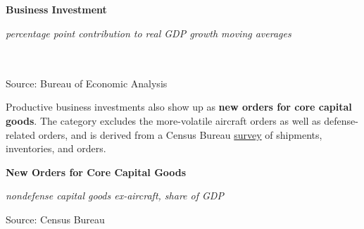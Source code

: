 \documentclass{report}
\newcommand{\tbllink}[1]{\href{https://raw.githubusercontent.com/bdecon/US-chartbook/master/chartbook/data/#1}{\faTable}}
\begin{document}
{{{\begin{minipage}{0.76\textwidth}
\vspace{3mm}

\small

 

\end{minipage}

\noindent \normalsize \textbf{Business Investment}\\
\footnotesize{\textit{percentage point contribution to real GDP growth \hspace{36mm} moving averages}\\ \vspace{4mm}
\noindent {} \setlength{\tabcolsep}{3.1pt} \color{black!90}
		{\renewcommand{\arraystretch}{1.55}
		 \begin{tabular}{p{42mm} R{6.7mm} R{6.7mm} R{6.7mm} R{6.7mm} R{6.7mm} 
		   R{7.8mm} R{6.7mm} R{6.7mm} }
			 \hline
		\end{tabular}
		}	\\
		
\vspace{-6mm}
\footnotesize{Source: Bureau of Economic Analysis}
\newpage
\begin{minipage}{0.33\textwidth}
\small Productive business investments also show up as \textbf{new orders for core capital goods}. The category excludes the more-volatile aircraft orders as well as defense-related orders, and is derived from a Census Bureau \href{https://www.census.gov/manufacturing/m3/index.html}{survey} of shipments, inventories, and orders.  \\


\end{minipage} \hspace{6mm}
\begin{minipage}{0.43\textwidth}

\noindent \normalsize \textbf{New Orders for Core Capital Goods}

\footnotesize{\textit{nondefense capital goods ex-aircraft, share of GDP}}

\noindent \hspace*{-2mm} 

\footnotesize{Source: Census Bureau} \hspace{23mm} \tbllink{dgno.csv}
\end{minipage}


\vspace{12mm}

}}}}
\end{document}
